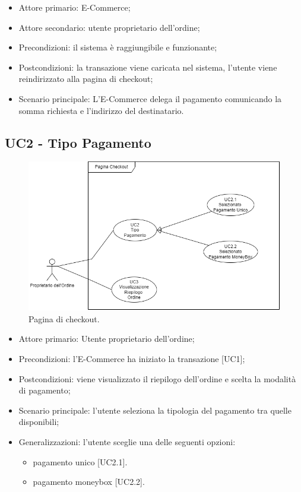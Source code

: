 \begin{itemize}
    \item Attore primario: E-Commerce;
    \item Attore secondario: utente proprietario dell'ordine;
    \item Precondizioni: il sistema è raggiungibile e funzionante;
    \item Postcondizioni: la transazione viene caricata nel sistema, l'utente viene reindirizzato alla pagina di checkout;
    \item Scenario principale: L'E-Commerce delega il pagamento comunicando la somma richiesta e l'indirizzo del destinatario.
\end{itemize}

\subsection{UC2 - Tipo Pagamento}

    \begin{figure}[H]
    \centering
    \includegraphics[scale=0.7]{immagini/UseCases-UC2-1.png}
    \caption{Pagina di checkout.}
  \end{figure}

    \begin{itemize}
    \item Attore primario: Utente proprietario dell'ordine;
    \item Precondizioni: l'E-Commerce ha iniziato la transazione [UC1];
    \item Postcondizioni: viene visualizzato il riepilogo dell'ordine e scelta la modalità di pagamento;
    \item Scenario principale: l'utente seleziona la tipologia del pagamento tra quelle disponibili;
    \item Generalizzazioni: l'utente sceglie una delle seguenti opzioni:
    \begin{itemize}
        \item pagamento unico [UC2.1].
        \item pagamento moneybox [UC2.2].
    \end{itemize}
    \end{itemize}
    \clearpage

